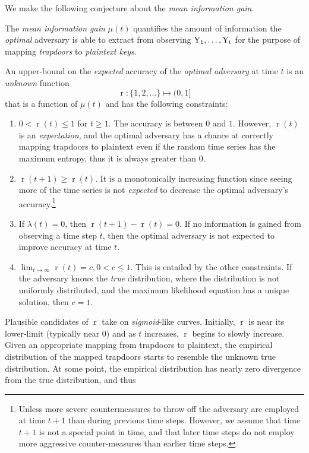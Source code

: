 \documentclass[ ../main.tex]{subfiles}
\begin{document}
We make the following conjecture about the \emph{mean information gain}.
\begin{conjecture}
The \emph{mean information gain} $\mu(t)$ quantifies the amount of information the \emph{optimal} adversary is able to extract from observing $\mathrm{Y_1}, \ldots, \mathrm{Y_t}$ for the purpose of mapping \emph{trapdoors} to \emph{plaintext keys}.

An upper-bound on the \emph{expected} accuracy of the \emph{optimal adversary} at time $t$ is an \emph{unknown} function
\begin{equation}
    \operatorname{r} \colon \{1,2,\ldots\} \mapsto (0,1]
\end{equation}
that is a function of $\mu(t)$ and has the following constraints:
\begin{enumerate}
    \item $0 < \operatorname{r}(t) \leq 1$ for $t \geq 1$. The accuracy is between $0$ and $1$. However, $\operatorname{r}(t)$ is an \emph{expectation}, and the optimal adversary has a chance at correctly mapping trapdoors to plaintext even if the random time series has the maximum entropy, thus it is always greater than $0$.
    \item $\operatorname{r}(t+1) \geq \operatorname{r}(t)$. It is a monotonically increasing function since seeing more of the time series is not \emph{expected} to decrease the optimal adversary's accuracy.\footnote{Unless more severe countermeasures to throw off the adversary are employed at time $t+1$ than during previous time steps. However, we assume that time $t+1$ is not a special point in time, and that later time steps do not employ more aggressive counter-measures than earlier time steps.}
    \item If $\lambda(t) = 0$, then $\operatorname{r}(t+1) - \operatorname{r}(t) = 0$. If no information is gained from observing a time step $t$, then the optimal adversary is not expected to improve accuracy at time $t$.
    \item $\lim_{t \to \infty} \operatorname{r}(t) = c, 0 < c \leq 1$. This is entailed by the other constraints. If the adversary knows the \emph{true} distribution, where the distribution is not uniformly distributed, and the maximum likelihood equation has a unique solution, then $c = 1$.
\end{enumerate}
\end{conjecture}
Plausible candidates of $\operatorname{r}$ take on \emph{sigmoid}-like curves. Initially, $\operatorname{r}$ is near its lower-limit (typically near $0$) and as $t$ increases, $\operatorname{r}$ begins to slowly increase. Given an appropriate mapping from trapdoors to plaintext, the empirical distribution of the mapped trapdoors starts to resemble the unknown true distribution. At some point, the empirical distribution has nearly zero divergence from the true distribution, and thus 
\end{document}
